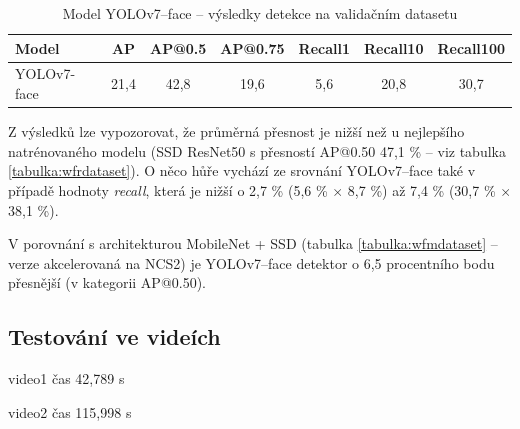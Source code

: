 \begin{table}[H]
  \begin{center}
    \begin{tabular}{|l|c|c|c|c|c|c|}
    \hline
    \rowcolor[HTML]{E0DBDB} 
    \textbf{Model}                      & \textbf{AP} & \textbf{AP@0.5} & \textbf{AP@0.75} & \textbf{Recall1} & \textbf{Recall10} & \textbf{Recall100} \\ \hline
    \cellcolor[HTML]{E0DBDB}YOLOv7-face & 21,4        & 42,8            & 19,6             & 5,6              & 20,8              & 30,7               \\ \hline
    \end{tabular}
    \label{tabulka:yolov7face}
    \caption{Model YOLOv7--face -- výsledky detekce na validačním datasetu}
  \end{center}
\end{table}

Z výsledků lze vypozorovat, že průměrná přesnost je nižší než u nejlepšího natrénovaného modelu (SSD ResNet50 s přesností AP@0.50 47,1 \% -- viz tabulka \ref{tabulka:wfrdataset}). O něco hůře vychází ze srovnání YOLOv7--face také v případě hodnoty \emph{recall}, která je nižší o 2,7 \% (5,6 \% $\times$ 8,7 \%) až 7,4 \% (30,7 \% $\times$ 38,1 \%). 

V porovnání s architekturou MobileNet + SSD (tabulka \ref{tabulka:wfmdataset} -- verze akcelerovaná na NCS2) je YOLOv7--face detektor o 6,5 procentního bodu přesnější (v kategorii AP@0.50).


\subsection*{Testování ve videích}

video1 čas 42,789 s

video2 čas 115,998 s

